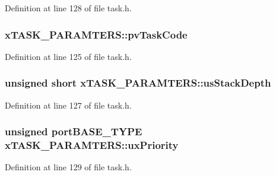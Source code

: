 Definition at line 128 of file task.\-h.

\hypertarget{structx_t_a_s_k___p_a_r_a_m_t_e_r_s_a6cf96a364e0960bde2091fc333db4fe8}{
\subsubsection[{pv\-Task\-Code}]{ x\-T\-A\-S\-K\-\_\-\-P\-A\-R\-A\-M\-T\-E\-R\-S\-::pv\-Task\-Code}}\label{structx_t_a_s_k___p_a_r_a_m_t_e_r_s_a6cf96a364e0960bde2091fc333db4fe8}


Definition at line 125 of file task.\-h.

\hypertarget{structx_t_a_s_k___p_a_r_a_m_t_e_r_s_a78a22fdc211362ec426d12678c6f538f}{
\subsubsection[{us\-Stack\-Depth}]{\setlength{\rightskip}{0pt plus 5cm}unsigned short x\-T\-A\-S\-K\-\_\-\-P\-A\-R\-A\-M\-T\-E\-R\-S\-::us\-Stack\-Depth}}\label{structx_t_a_s_k___p_a_r_a_m_t_e_r_s_a78a22fdc211362ec426d12678c6f538f}


Definition at line 127 of file task.\-h.

\hypertarget{structx_t_a_s_k___p_a_r_a_m_t_e_r_s_a986b666d0e341b98f5924c3531e43fc3}{
\subsubsection[{ux\-Priority}]{\setlength{\rightskip}{0pt plus 5cm}unsigned port\-B\-A\-S\-E\-\_\-\-T\-Y\-P\-E x\-T\-A\-S\-K\-\_\-\-P\-A\-R\-A\-M\-T\-E\-R\-S\-::ux\-Priority}}\label{structx_t_a_s_k___p_a_r_a_m_t_e_r_s_a986b666d0e341b98f5924c3531e43fc3}


Definition at line 129 of file task.\-h.


